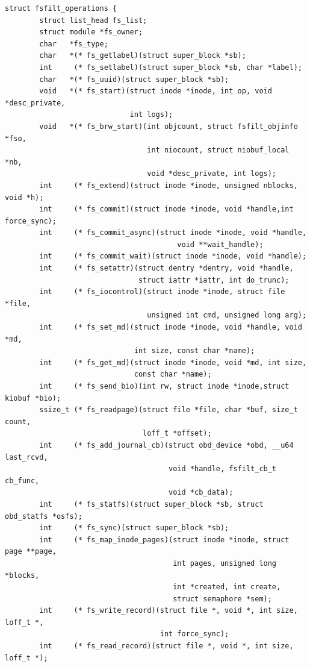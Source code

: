 \begin{Verbatim}
struct fsfilt_operations {
        struct list_head fs_list;
        struct module *fs_owner;
        char   *fs_type;
        char   *(* fs_getlabel)(struct super_block *sb);
        int     (* fs_setlabel)(struct super_block *sb, char *label);
        char   *(* fs_uuid)(struct super_block *sb);
        void   *(* fs_start)(struct inode *inode, int op, void *desc_private,
                             int logs);
        void   *(* fs_brw_start)(int objcount, struct fsfilt_objinfo *fso,
                                 int niocount, struct niobuf_local *nb,
                                 void *desc_private, int logs);
        int     (* fs_extend)(struct inode *inode, unsigned nblocks, void *h);
        int     (* fs_commit)(struct inode *inode, void *handle,int force_sync);
        int     (* fs_commit_async)(struct inode *inode, void *handle,
                                        void **wait_handle);
        int     (* fs_commit_wait)(struct inode *inode, void *handle);
        int     (* fs_setattr)(struct dentry *dentry, void *handle,
                               struct iattr *iattr, int do_trunc);
        int     (* fs_iocontrol)(struct inode *inode, struct file *file,
                                 unsigned int cmd, unsigned long arg);
        int     (* fs_set_md)(struct inode *inode, void *handle, void *md,
                              int size, const char *name);
        int     (* fs_get_md)(struct inode *inode, void *md, int size,
                              const char *name);
        int     (* fs_send_bio)(int rw, struct inode *inode,struct kiobuf *bio);
        ssize_t (* fs_readpage)(struct file *file, char *buf, size_t count,
                                loff_t *offset);
        int     (* fs_add_journal_cb)(struct obd_device *obd, __u64 last_rcvd,
                                      void *handle, fsfilt_cb_t cb_func,
                                      void *cb_data);
        int     (* fs_statfs)(struct super_block *sb, struct obd_statfs *osfs);
        int     (* fs_sync)(struct super_block *sb);
        int     (* fs_map_inode_pages)(struct inode *inode, struct page **page,
                                       int pages, unsigned long *blocks,
                                       int *created, int create,
                                       struct semaphore *sem);
        int     (* fs_write_record)(struct file *, void *, int size, loff_t *,
                                    int force_sync);
        int     (* fs_read_record)(struct file *, void *, int size, loff_t *);

\end{Verbatim}
